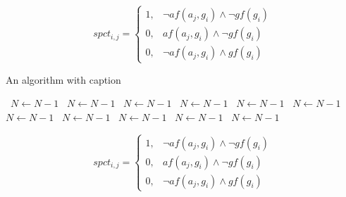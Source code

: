 \documentclass[a4paper]{article}
\begin{document}
\begin{equation}
spct_{i,j} =
\begin{cases}
1, & \text{$\neg af(a_j,g_i) \wedge \neg gf(g_i)$}\\
0, & \text{$af(a_j,g_i) \wedge \neg gf(g_i)$}\\
0, & \text{$\neg af(a_j,g_i) \wedge gf(g_i)$}
\end{cases}
\end{equation}

\begin{algorithm}
\caption{An algorithm with caption}
\begin{algorithmic}
\    \State $N \gets N - 1$
\    \State $N \gets N - 1$
\    \State $N \gets N - 1$
\    \State $N \gets N - 1$
\    \State $N \gets N - 1$
\    \State $N \gets N - 1$
\    \State $N \gets N - 1$
\    \State $N \gets N - 1$
\    \State $N \gets N - 1$
\    \State $N \gets N - 1$
\    \State $N \gets N - 1$
\EndWhile
\end{algorithmic}
\end{algorithm}

\begin{equation}
spct_{i,j} =
\begin{cases}
1, & \text{$\neg af(a_j,g_i) \wedge \neg gf(g_i)$}\\
0, & \text{$af(a_j,g_i) \wedge \neg gf(g_i)$}\\
0, & \text{$\neg af(a_j,g_i) \wedge gf(g_i)$}
\end{cases}
\end{equation}
\end{document}
